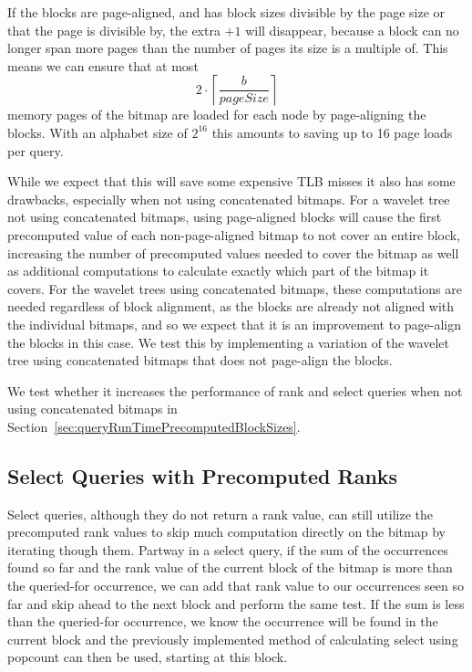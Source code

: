 If the blocks are page-aligned, and has block sizes divisible by the page size or that the page is divisible by, the extra $+1$ will disappear, because a block can no longer span more pages than the number of pages its size is a multiple of.
This means we can ensure that at most \[2 \cdot \left\lceil\frac{b}{\mathit{pageSize}}\right\rceil\] memory pages of the bitmap are loaded for each node by page-aligning the blocks.
With an alphabet size of $2^{16}$ this amounts to saving up to 16 page loads per query.

While we expect that this will save some expensive TLB misses it also has some drawbacks, especially when not using concatenated bitmaps.
For a wavelet tree not using concatenated bitmaps, using page-aligned blocks will cause the first precomputed value of each non-page-aligned bitmap to not cover an entire block, increasing the number of precomputed values needed to cover the bitmap as well as additional computations to calculate exactly which part of the bitmap it covers.
For the wavelet trees using concatenated bitmaps, these computations are needed regardless of block alignment, as the blocks are already not aligned with the individual bitmaps, and so we expect that it is an improvement to page-align the blocks in this case.
We test this by implementing a variation of the wavelet tree using concatenated bitmaps that does not page-align the blocks.

We test whether it increases the performance of rank and select queries when not using concatenated bitmaps in Section~\ref{sec:queryRunTimePrecomputedBlockSizes}.


\subsection{Select Queries with Precomputed Ranks}
Select queries, although they do not return a rank value, can still utilize the precomputed rank values to skip much computation directly on the bitmap by iterating though them.
Partway in a select query, if the sum of the occurrences found so far and the rank value of the current block of the bitmap is more than the queried-for occurrence, we can add that rank value to our occurrences seen so far and skip ahead to the next block and perform the same test.
If the sum is less than the queried-for occurrence, we know the occurrence will be found in the current block and the previously implemented method of calculating select using popcount can then be used, starting at this block.


